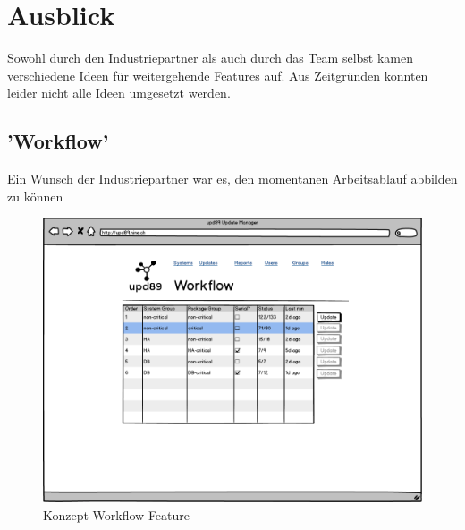 \chapter{Ausblick}

Sowohl durch den Industriepartner als auch durch das Team selbst kamen verschiedene Ideen für weitergehende Features auf. Aus Zeitgründen konnten leider nicht alle Ideen umgesetzt werden.

\section{'Workflow'}

Ein Wunsch der Industriepartner war es, den momentanen Arbeitsablauf abbilden zu können



\begin{figure}[H]
	\centering
	\includegraphics[width=\linewidth]{files/workflow_clean}
	\caption{Konzept Workflow-Feature}
	\label{fig:ausblick:workflow}
\end{figure}




